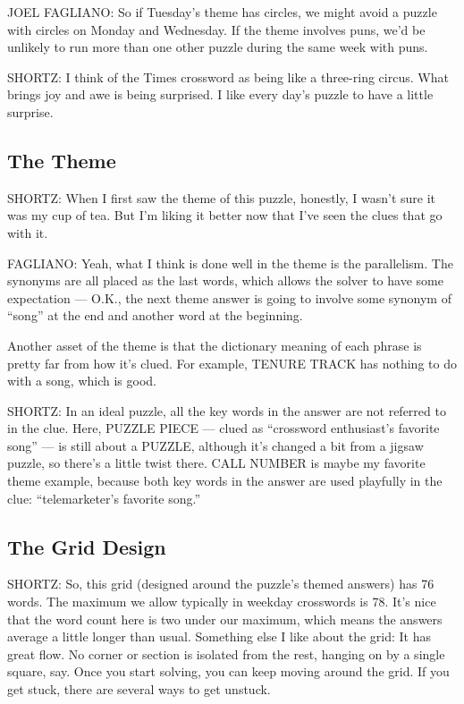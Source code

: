 JOEL FAGLIANO: So if Tuesday's theme has circles, we might avoid a
puzzle with circles on Monday and Wednesday. If the theme involves puns,
we'd be unlikely to run more than one other puzzle during the same week
with puns.

SHORTZ: I think of the Times crossword as being like a three-ring
circus. What brings joy and awe is being surprised. I like every day's
puzzle to have a little surprise.

\hypertarget{the-theme}{%
\subsection{The Theme}\label{the-theme}}

SHORTZ: When I first saw the theme of this puzzle, honestly, I wasn't
sure it was my cup of tea. But I'm liking it better now that I've seen
the clues that go with it.

FAGLIANO: Yeah, what I think is done well in the theme is the
parallelism. The synonyms are all placed as the last words, which allows
the solver to have some expectation --- O.K., the next theme answer is
going to involve some synonym of ``song'' at the end and another word at
the beginning.

Another asset of the theme is that the dictionary meaning of each phrase
is pretty far from how it's clued. For example, TENURE TRACK has nothing
to do with a song, which is good.

SHORTZ: In an ideal puzzle, all the key words in the answer are not
referred to in the clue. Here, PUZZLE PIECE --- clued as ``crossword
enthusiast's favorite song'' --- is still about a PUZZLE, although it's
changed a bit from a jigsaw puzzle, so there's a little twist there.
CALL NUMBER is maybe my favorite theme example, because both key words
in the answer are used playfully in the clue: ``telemarketer's favorite
song.''

\hypertarget{the-grid-design}{%
\subsection{The Grid Design}\label{the-grid-design}}

SHORTZ: So, this grid (designed around the puzzle's themed answers) has
76 words. The maximum we allow typically in weekday crosswords is 78.
It's nice that the word count here is two under our maximum, which means
the answers average a little longer than usual. Something else I like
about the grid: It has great flow. No corner or section is isolated from
the rest, hanging on by a single square, say. Once you start solving,
you can keep moving around the grid. If you get stuck, there are several
ways to get unstuck.

